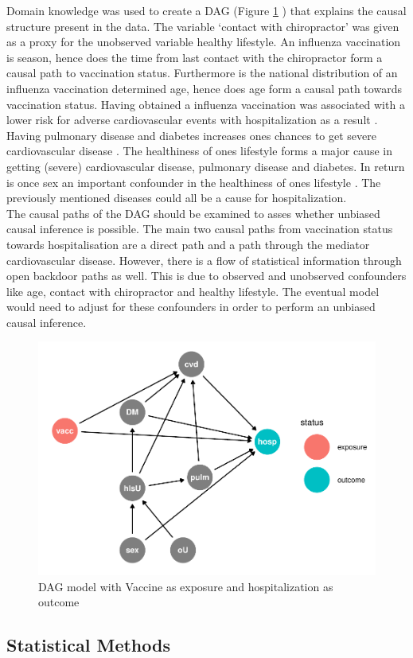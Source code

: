 \documentclass[
]{article}
\begin{document}
Domain knowledge was used to create a DAG (Figure \ref{fig:dag} ) that explains the causal structure present in the data. The variable `contact with chiropractor' was given as a proxy for the unobserved variable healthy lifestyle. An influenza vaccination is season, hence does the time from last contact with the chiropractor form a causal path to vaccination status. Furthermore is the national distribution of an influenza vaccination determined age, hence does age form a causal path towards vaccination status. Having obtained a influenza vaccination was associated with a lower risk for adverse cardiovascular events with hospitalization as a result \citep{behrouzi}. Having pulmonary disease and diabetes increases ones chances to get severe cardiovascular disease \citep{nhg}. The healthiness of ones lifestyle forms a major cause in getting (severe) cardiovascular disease, pulmonary disease and diabetes. In return is once sex an important confounder in the healthiness of ones lifestyle \citep{loef}. The previously mentioned diseases could all be a cause for hospitalization.\\
The causal paths of the DAG should be examined to asses whether unbiased causal inference is possible. The main two causal paths from vaccination status towards hospitalisation are a direct path and a path through the mediator cardiovascular disease. However, there is a flow of statistical information through open backdoor paths as well. This is due to observed and unobserved confounders like age, contact with chiropractor and healthy lifestyle. The eventual model would need to adjust for these confounders in order to perform an unbiased causal inference.

\begin{figure}
\includegraphics[width=0.5\linewidth]{Assignment_files/figure-latex/dag-1} \caption{DAG model with Vaccine as exposure and hospitalization as outcome}\label{fig:dag}
\end{figure}

\hypertarget{statistical-methods}{%
\subsection{Statistical Methods}\label{statistical-methods}}
\end{document}
